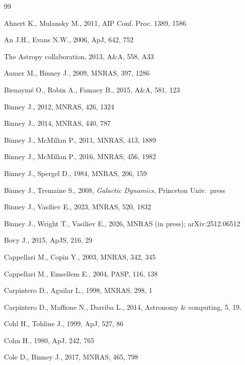 \documentclass[12pt]{article}
\begin{document}
\newpage
{}

\begin{thebibliography}{99} \setlength{\parskip}{2pt} \setlength{\itemsep}{2pt}

Ahnert K., Mulansky M., 2011, AIP Conf. Proc. 1389, 1586

An J.H., Evans N.W., 2006, ApJ, 642, 752

The Astropy collaboration, 2013, A\&A, 558, A33

Aumer M., Binney J., 2009, MNRAS, 397, 1286

Bienaym\'e O., Robin A., Famaey B., 2015, A\&A, 581, 123

Binney J., 2012, MNRAS, 426, 1324

Binney J., 2014, MNRAS, 440, 787

Binney J., McMillan P., 2011, MNRAS, 413, 1889

Binney J., McMillan P., 2016, MNRAS, 456, 1982

Binney J., Spergel D., 1984, MNRAS, 206, 159

Binney J., Tremaine S., 2008, \textsl{Galactic Dynamics}, Princeton Univ.\ press

Binney J., Vasiliev E., 2023, MNRAS, 520, 1832

Binney J., Wright T., Vasiliev E., 2026, MNRAS (in press); arXiv:2512.06512

Bovy J., 2015, ApJS, 216, 29

Cappellari M., Copin Y., 2003, MNRAS, 342, 345

Cappellari M., Emsellem E., 2004, PASP, 116, 138

Carpintero D., Aguilar L., 1998, MNRAS, 298, 1

Carpintero D., Maffione N., Darriba L., 2014, Astronomy \& computing, 5, 19.

Cohl H., Tohline J., 1999, ApJ, 527, 86

Cohn H., 1980, ApJ, 242, 765

Cole D., Binney J., 2017, MNRAS, 465, 798


\end{thebibliography}
\end{document}
